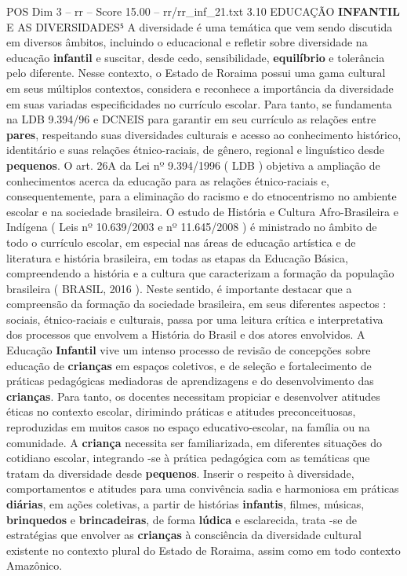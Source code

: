 \begin{textsample}{POS Dim 3 – rr – Score 15.00 – rr/rr\_inf\_21.txt}  \label{ex:f3_pos_230}
3.10 EDUCAÇÃO \textbf{INFANTIL} E AS DIVERSIDADES⁵ A diversidade é uma temática que vem sendo discutida em diversos âmbitos, incluindo o educacional e refletir sobre diversidade na educação \textbf{infantil} e suscitar, desde cedo, sensibilidade, \textbf{equilíbrio} e tolerância pelo diferente.
Nesse contexto, o Estado de Roraima possui uma gama cultural em seus múltiplos contextos, considera e reconhece a importância da diversidade em suas variadas especificidades no currículo escolar.
Para tanto, se fundamenta na LDB 9.394/96 e DCNEIS para garantir em seu currículo as relações entre \textbf{pares}, respeitando suas diversidades culturais e acesso ao conhecimento histórico, identitário e suas relações étnico-raciais, de gênero, regional e linguístico desde \textbf{pequenos}.
O art. 26A da Lei nº 9.394/1996 ( LDB ) objetiva a ampliação de conhecimentos acerca da educação para as relações étnico-raciais e, consequentemente, para a eliminação do racismo e do etnocentrismo no ambiente escolar e na sociedade brasileira.
O estudo de História e Cultura Afro-Brasileira e Indígena ( Leis nº 10.639/2003 e nº 11.645/2008 ) é ministrado no âmbito de todo o currículo escolar, em especial nas áreas de educação artística e de literatura e história brasileira, em todas as etapas da Educação Básica, compreendendo a história e a cultura que caracterizam a formação da população brasileira ( BRASIL, 2016 ).
Neste sentido, é importante destacar que a compreensão da formação da sociedade brasileira, em seus diferentes aspectos : sociais, étnico-raciais e culturais, passa por uma leitura crítica e interpretativa dos processos que envolvem a História do Brasil e dos atores envolvidos.
A Educação \textbf{Infantil} vive um intenso processo de revisão de concepções sobre educação de \textbf{crianças} em espaços coletivos, e de seleção e fortalecimento de práticas pedagógicas mediadoras de aprendizagens e do desenvolvimento das \textbf{crianças}.
Para tanto, os docentes necessitam propiciar e desenvolver atitudes éticas no contexto escolar, dirimindo práticas e atitudes preconceituosas, reproduzidas em muitos casos no espaço educativo-escolar, na família ou na comunidade.
A \textbf{criança} necessita ser familiarizada, em diferentes situações do cotidiano escolar, integrando -se à prática pedagógica com as temáticas que tratam da diversidade desde \textbf{pequenos}.
Inserir o respeito à diversidade, comportamentos e atitudes para uma convivência sadia e harmoniosa em práticas \textbf{diárias}, em ações coletivas, a partir de histórias \textbf{infantis}, filmes, músicas, \textbf{brinquedos} e \textbf{brincadeiras}, de forma \textbf{lúdica} e esclarecida, trata -se de estratégias que envolver as \textbf{crianças} à consciência da diversidade cultural existente no contexto plural do Estado de Roraima, assim como em todo contexto Amazônico.

\end{textsample}
